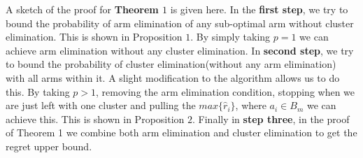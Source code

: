 \begin{remark}
\label{Result:Rem:6}
A sketch of the proof for \textbf{Theorem $1$} is given here. In the \textbf{first step}, we try to bound the probability of arm elimination of any sub-optimal arm without cluster elimination. This is shown in Proposition $1$. By simply taking $p=1$ we can achieve arm elimination without any cluster elimination. In \textbf{second step}, we try to bound the probability of cluster elimination(without any arm elimination) with all arms within it.  A slight modification to the algorithm allows us to do this. By taking $p>1$, removing the arm elimination condition, stopping when we are just left with one cluster and pulling the $max\lbrace \hat{r}_{i}\rbrace$, where $a_{i}\in B_{m}$ we can achieve this.  This is shown in Proposition $2$. Finally in \textbf{step three}, in the proof of Theorem 1 we combine both arm elimination and cluster elimination to get the regret upper bound.  
\end{remark}
	




